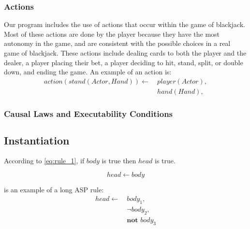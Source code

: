 \documentclass{article}
\begin{document}
\subsubsection{Actions}

Our program includes the use of actions that occur within the game of blackjack.
Most of these actions are done by the player because they have the most autonomy in the game,
and are consistent with the possible choices in a real game of blackjack.
These actions include dealing cards to both the player and the dealer, a player placing their bet,
a player deciding to hit, stand, split, or double down, and ending the game.
An example of an action is:
\begin{equation}
    \begin{split}
        action(stand(Actor, Hand)) \leftarrow \
            & player(Actor), \\
            & hand(Hand),
    \end{split}
\end{equation}

\subsubsection{Causal Laws and Executability Conditions}

\subsection{Instantiation}


According to \cref{eq:rule_1}, if $body$ is true then $head$ is true.

\begin{equation}
    \label{eq:rule_1}
    head \leftarrow body
\end{equation}

 is an example of a long ASP rule:
\begin{equation}
\begin{split}
    \label{eq:rule_2}
    head \leftarrow \
        & body_1, \\
        & \neg body_2, \\
        & \textbf{not } body_3
\end{split}
\end{equation}
\end{document}
